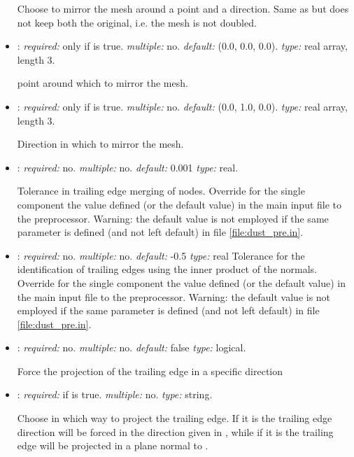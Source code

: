 \begin{itemize}
Choose to mirror the mesh around a point and a direction. Same as  
but does not keep both the original, i.e. the mesh is not doubled.

\item {}: \textit{required:} only if  is true. 
\textit{multiple:} no. \textit{default:} (0.0, 0.0, 0.0). \textit{type:} real array, length 3.

point around which to mirror the mesh.

\item {}: \textit{required:} only if  is true. 
\textit{multiple:} no. \textit{default:} (0.0, 1.0, 0.0). \textit{type:} real array, length 3.

Direction in which to mirror the mesh.

\item {}: \textit{required:} no. \textit{multiple:} no. \textit{default:} 0.001 \textit{type:} real.

Tolerance in trailing edge merging of nodes. Override for the single component the value 
defined (or the default value) in the main input file to the preprocessor. 
Warning: the default value is not employed if the same parameter is defined (and not left default) in file \ref{file:dust_pre.in}. 

\item {}: \textit{required:} no. \textit{multiple:} no. \textit{default:} -0.5 \textit{type:} real
Tolerance for the identification of trailing edges using the inner product of the normals.
Override for the single component the value defined (or the default value) 
in the main input file to the preprocessor. Warning: the default value is not 
employed if the same parameter is defined (and not left default) in file \ref{file:dust_pre.in}. 

\item {}: \textit{required:} no. \textit{multiple:} no. \textit{default:} false \textit{type:} logical.

Force the projection of the trailing edge in a specific direction

\item {}: \textit{required:} if  is true. \textit{multiple:} no. \textit{type:} string.

Choose in which way to project the trailing edge. If it is  the 
trailing edge direction will be forced in the direction given in , 
while if it is  the trailing edge will be projected in a plane normal to .


\end{itemize}
